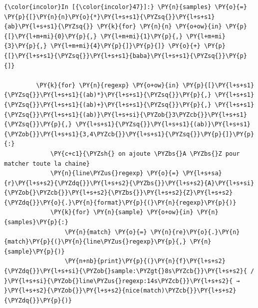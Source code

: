     \begin{Verbatim}[commandchars=\\\{\}]
{\color{incolor}In [{\color{incolor}47}]:} \PY{n}{samples} \PY{o}{=} \PY{p}{[}\PY{n}{n}\PY{o}{*}\PY{l+s+s1}{\PYZsq{}}\PY{l+s+s1}{ab}\PY{l+s+s1}{\PYZsq{}} \PY{k}{for} \PY{n}{n} \PY{o+ow}{in} \PY{p}{[}\PY{l+m+mi}{0}\PY{p}{,} \PY{l+m+mi}{1}\PY{p}{,} \PY{l+m+mi}{3}\PY{p}{,} \PY{l+m+mi}{4}\PY{p}{]}\PY{p}{]} \PY{o}{+} \PY{p}{[}\PY{l+s+s1}{\PYZsq{}}\PY{l+s+s1}{baba}\PY{l+s+s1}{\PYZsq{}}\PY{p}{]}
         
         \PY{k}{for} \PY{n}{regexp} \PY{o+ow}{in} \PY{p}{[}\PY{l+s+s1}{\PYZsq{}}\PY{l+s+s1}{(ab)*}\PY{l+s+s1}{\PYZsq{}}\PY{p}{,} \PY{l+s+s1}{\PYZsq{}}\PY{l+s+s1}{(ab)+}\PY{l+s+s1}{\PYZsq{}}\PY{p}{,} \PY{l+s+s1}{\PYZsq{}}\PY{l+s+s1}{(ab)}\PY{l+s+si}{\PYZob{}3\PYZcb{}}\PY{l+s+s1}{\PYZsq{}}\PY{p}{,} \PY{l+s+s1}{\PYZsq{}}\PY{l+s+s1}{(ab)}\PY{l+s+s1}{\PYZob{}}\PY{l+s+s1}{3,4\PYZcb{}}\PY{l+s+s1}{\PYZsq{}}\PY{p}{]}\PY{p}{:}
             \PY{c+c1}{\PYZsh{} on ajoute \PYZbs{}A \PYZbs{}Z pour matcher toute la chaine}
             \PY{n}{line\PYZus{}regexp} \PY{o}{=} \PY{l+s+sa}{r}\PY{l+s+s2}{\PYZdq{}}\PY{l+s+s2}{\PYZbs{}}\PY{l+s+s2}{A}\PY{l+s+si}{\PYZob{}\PYZcb{}}\PY{l+s+s2}{\PYZbs{}}\PY{l+s+s2}{Z}\PY{l+s+s2}{\PYZdq{}}\PY{o}{.}\PY{n}{format}\PY{p}{(}\PY{n}{regexp}\PY{p}{)}
             \PY{k}{for} \PY{n}{sample} \PY{o+ow}{in} \PY{n}{samples}\PY{p}{:}
                 \PY{n}{match} \PY{o}{=} \PY{n}{re}\PY{o}{.}\PY{n}{match}\PY{p}{(}\PY{n}{line\PYZus{}regexp}\PY{p}{,} \PY{n}{sample}\PY{p}{)}
                 \PY{n+nb}{print}\PY{p}{(}\PY{n}{f}\PY{l+s+s2}{\PYZdq{}}\PY{l+s+si}{\PYZob{}sample:\PYZgt{}8s\PYZcb{}}\PY{l+s+s2}{ / }\PY{l+s+si}{\PYZob{}line\PYZus{}regexp:14s\PYZcb{}}\PY{l+s+s2}{ → }\PY{l+s+s2}{\PYZob{}}\PY{l+s+s2}{nice(match)\PYZcb{}}\PY{l+s+s2}{\PYZdq{}}\PY{p}{)}
\end{Verbatim}


